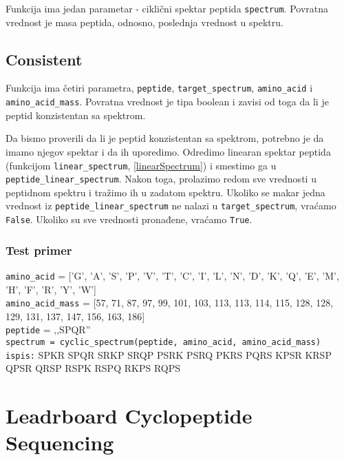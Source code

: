 Funkcija ima jedan parametar - ciklični spektar peptida \texttt{spectrum}. Povratna vrednost je masa peptida, odnosno, poslednja vrednost u spektru.



\subsection{Consistent}
\label{consistent}

Funkcija ima četiri parametra, \texttt{peptide}, \texttt{target\_spectrum}, \texttt{amino\_acid} i \texttt{amino\_acid\_mass}. Povratna vrednost je tipa boolean i zavisi od toga da li je peptid konzistentan sa spektrom.

Da bismo proverili da li je peptid konzistentan sa spektrom, potrebno je da imamo njegov spektar i da ih uporedimo. Odredimo linearan spektar peptida (funkcijom \texttt{linear\_spectrum}, \ref{linearSpectrum}) i smestimo ga u \texttt{peptide\_linear\_spectrum}. Nakon toga, prolazimo redom sve vrednosti u peptidnom spektru i tražimo ih u zadatom spektru. Ukoliko se makar jedna vrednost iz \texttt{peptide\_linear\_spectrum} ne nalazi u \texttt{target\_spectrum}, vraćamo \texttt{False}. Ukoliko su sve vrednosti pronađene, vraćamo \texttt{True}.




\subsubsection{Test primer}

\noindent\texttt{amino\_acid} = ['G', 'A', 'S', 'P', 'V', 'T', 'C', 'I', 'L', 'N', 'D', 'K', 'Q', 'E', 'M', 'H', 'F', 'R', 'Y', 'W']
\\
\texttt{amino\_acid\_mass} = [57, 71, 87, 97, 99, 101, 103, 113, 113, 114, 115, 128, 128, 129, 131, 137, 147, 156, 163, 186]
\\
\texttt{peptide} = ‚‚SPQR''
\\\texttt{spectrum = cyclic\_spectrum(peptide, amino\_acid, amino\_acid\_mass)}
\\\texttt{ispis:} SPKR
SPQR
SRKP
SRQP
PSRK
PSRQ
PKRS
PQRS
KPSR
KRSP
QPSR
QRSP
RSPK
RSPQ
RKPS
RQPS



\section{Leadrboard Cyclopeptide Sequencing}

